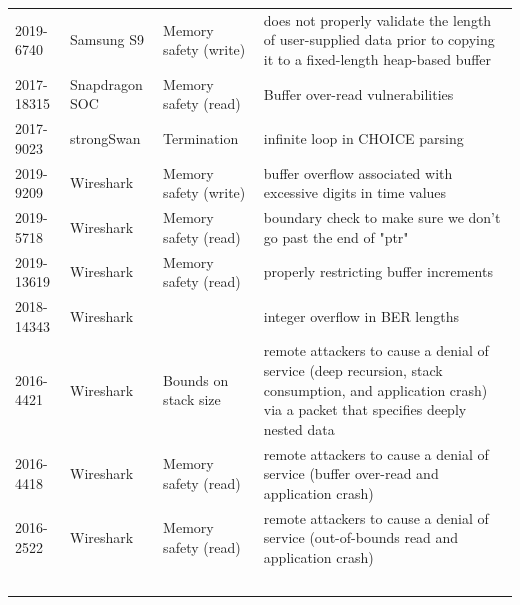 \documentclass[10p,conference]{IEEEtran}
\begin{document}
\begin{longtable}{ l l l p{25em} }
2019-6740    & Samsung S9    & Memory safety (write) & does not properly validate the length of user-supplied data prior to copying it to a fixed-length heap-based buffer \\ 
2017-18315   & Snapdragon SOC & Memory safety (read) & Buffer over-read vulnerabilities \\ 
2017-9023    & strongSwan    & Termination & infinite loop in CHOICE parsing \\ 
2019-9209    & Wireshark     & Memory safety (write) & buffer overflow associated with excessive digits in time values \\ 
2019-5718    & Wireshark     & Memory safety (read) & boundary check to make sure we don't go past the end of "ptr" \\ 
2019-13619   & Wireshark     & Memory safety (read) & properly restricting buffer increments \\ 
2018-14343   & Wireshark     &  & integer overflow in BER lengths \\ 
2016-4421    & Wireshark     & Bounds on stack size & remote attackers to cause a denial of service (deep recursion, stack consumption, and application crash) via a packet that specifies deeply nested data \\ 
2016-4418    & Wireshark     & Memory safety (read) & remote attackers to cause a denial of service (buffer over-read and application crash) \\ 
2016-2522    & Wireshark     & Memory safety (read) & remote attackers to cause a denial of service (out-of-bounds read and application crash) \\ 
​\end{longtable} 


\begin{multicols}{2}\end{multicols}
\end{document}
